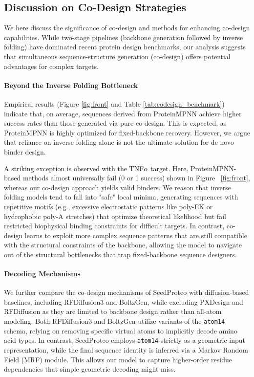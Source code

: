 



\subsection{Discussion on Co-Design Strategies}
We here discuss the significance of co-design and methods for enhancing co-design capabilities. While two-stage pipelines (backbone generation followed by inverse folding) have dominated recent protein design benchmarks, our analysis suggests that simultaneous sequence-structure generation (co-design) offers potential advantages for complex targets.

\paragraph{Beyond the Inverse Folding Bottleneck}
Empirical results (Figure \ref{fig:front} and Table \ref{tab:codesign_benchmark}) indicate that, on average, sequences derived from ProteinMPNN achieve higher success rates than those generated via pure co-design. This is expected, as ProteinMPNN is highly optimized for fixed-backbone recovery. However, we argue that reliance on inverse folding alone is not the ultimate solution for de novo binder design.

A striking exception is observed with the TNF$\alpha$ target. Here, ProteinMPNN-based methods almost universally fail (0 or 1 success) shown in Figure ~\ref{fig:front}, whereas our co-design approach yields valid binders. We reason that inverse folding models tend to fall into "safe" local minima, generating sequences with repetitive motifs (e.g., excessive electrostatic patterns like poly-EK or hydrophobic poly-A stretches) that optimize theoretical likelihood but fail restricted biophysical binding constraints for difficult targets. In contrast, co-design learns to exploit more complex sequence patterns that are still compatible with the structural constraints of the backbone, allowing the model to navigate out of the structural bottlenecks that trap fixed-backbone sequence designers.

\paragraph{Decoding Mechanisms}
We further compare the co-design mechanisms of SeedProteo with diffusion-based baselines, including RFDiffusion3 and BoltzGen, while excluding PXDesign and RFDiffusion as they are limited to backbone design rather than all-atom modeling. Both RFDiffusion3 and BoltzGen utilize variants of the \texttt{atom14} schema, relying on removing specific virtual atoms to implicitly decode amino acid types. In contrast, SeedProteo employs \texttt{atom14} strictly as a geometric input representation, while the final sequence identity is inferred via a Markov Random Field (MRF) module. This allows our model to capture higher-order residue dependencies that simple geometric decoding might miss. 


